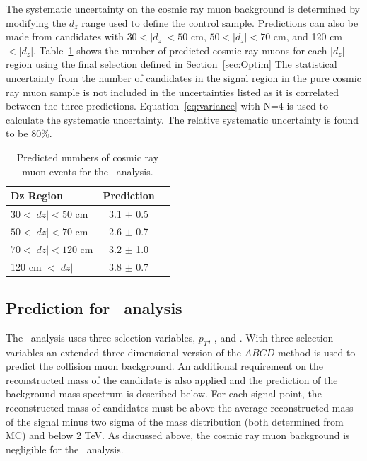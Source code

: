 The systematic uncertainty on the cosmic ray muon background is determined by
modifying the $d_z$ range used to define the control sample.  Predictions
can also be made from candidates with $30 < |d_z| < 50$ cm, $50 < |d_z| < 70$ cm, and
120 cm $< |d_z|$.  Table~\ref{tab:CosmicPred} shows the number of predicted cosmic ray muons
for each $|d_z|$ region using the final selection defined in Section~\ref{sec:Optim}
The statistical uncertainty from the number of candidates in the signal region in the
pure cosmic ray muon sample is not included in the uncertainties listed as it is correlated
between the three predictions.
Equation~\ref{eq:variance} with N=4 is used to calculate the systematic uncertainty.
The relative systematic uncertainty is found to be 80\%.

\begin{table}
 \begin{center}
  \caption{Predicted numbers of cosmic ray muon events for the \muononly\ analysis.}
     \label{tab:CosmicPred}
  \begin{tabular}{|l|c|c|} \hline
   Dz Region            & Prediction  \\ \hline
   $30 < |dz| < 50$ cm  & 3.1 $\pm$ 0.5   \\ \hline
   $50 < |dz| < 70$ cm  & 2.6 $\pm$ 0.7   \\ \hline
   $70 < |dz| < 120$ cm & 3.2 $\pm$ 1.0   \\ \hline
   120 cm $< |dz|$      & 3.8 $\pm$ 0.7   \\ \hline
  \end{tabular}
 \end{center}
\end{table}

\subsection{Prediction for \tktof\ analysis}

The \tktof\ analysis uses three selection variables, $p_T$, \invbeta, and \ias. With three selection variables an extended three dimensional version of the 
$ABCD$ method is used to predict the collision muon background. An additional requirement on the reconstructed mass of the candidate
is also applied and the prediction of the background mass spectrum is described below. 
For each signal point, the reconstructed mass of candidates must be above the average reconstructed mass of the signal minus two sigma of the mass
distribution (both determined from MC) and below 2 TeV.
As discussed above, the cosmic ray muon background is negligible
for the \tktof\ analysis. 


